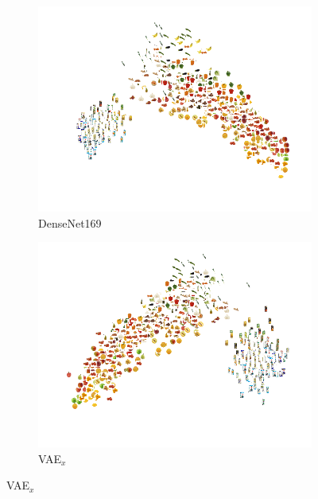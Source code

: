 

\begin{figure}[t]
     \centering
     \begin{subfigure}[b]{0.3\textwidth}
         \centering
         \includegraphics[width=\textwidth]{figures_and_tables/latent_space_visualizations/pca_densenet.png}
         \caption{DenseNet169}
         \label{fig:pca_densenet}
     \end{subfigure}
     \begin{subfigure}[b]{0.3\textwidth}
         \centering
         \includegraphics[width=\textwidth]{figures_and_tables/latent_space_visualizations/pca_latents_vae_seed2.png}
         \caption{VAE$_{x}$}
         \label{fig:pca_vae_x}
     \end{subfigure} 

\end{figure}
